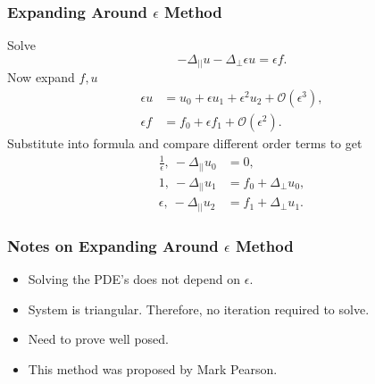 \documentclass{beamer}
\begin{document}
    \begin{frame}
\frametitle{Expanding Around $\epsilon$ Method}
Solve
\begin{equation*}
-\Delta_{||}u - \Delta_{\bot}\epsilon u = \epsilon f.
\end{equation*}
Now expand $f,u$ 
\begin{align*}
\epsilon u &= u_0 + \epsilon u_1 + \epsilon^2 u_2 + \mathcal{O}(\epsilon^3),\\
\epsilon f &= f_0 + \epsilon f_1 + \mathcal{O}(\epsilon^2).
\end{align*}
Substitute into formula and compare different order terms to get
\begin{align*}
\frac{1}{\epsilon},\  -\Delta_{||}u_0 &= 0, \\
1,\  -\Delta_{||}u_1 &= f_0 + \Delta_{\bot}u_0, \\
\epsilon,\  -\Delta_{||}u_2 &= f_1 + \Delta_{\bot}u_1.
\end{align*}
    \end{frame}
    \begin{frame}
        \frametitle{Notes on Expanding Around $\epsilon$ Method}
\begin{itemize}
    \item Solving the PDE's does not depend on $\epsilon$.
\item System is triangular. Therefore, no iteration required to solve.  
    \item Need to prove well posed.
    \item This method was proposed by Mark Pearson.
\end{itemize}

    \end{frame}
    
\end{document}
